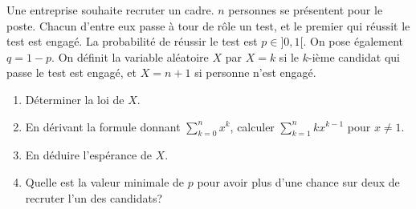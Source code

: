 \documentclass[../PolyS4.tex]{subfiles}
\begin{document}
Une entreprise souhaite recruter un cadre. $n$ personnes se présentent pour le poste. Chacun d'entre eux passe à tour de rôle un test, et le premier qui réussit le test est engagé. La probabilité de réussir le test est $p\in ]0,1[$. On pose également $q=1-p$. On définit la variable aléatoire $X$ par $X=k$ si le $k$-ième candidat qui passe le test est engagé, et $X=n+1$ si personne n'est engagé.
\begin{enumerate}
\item Déterminer la loi de $X$.
\item En dérivant la formule donnant $\sum_{k=0}^n x^k$, calculer $\sum_{k=1}^n kx^{k-1}$ pour $x\neq 1$.
\item En déduire l'espérance de $X$.
\item Quelle est la valeur minimale de $p$ pour avoir plus d'une chance sur deux de recruter l'un des candidats?\\
\end{enumerate}


\end{document}
